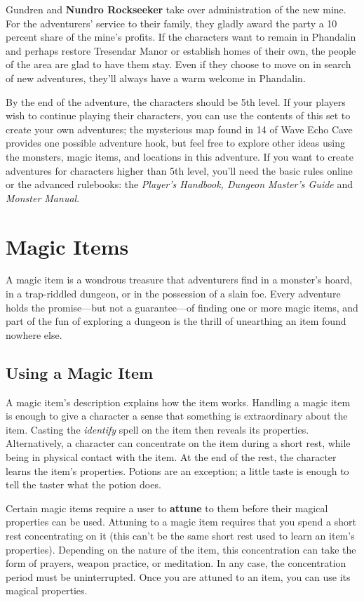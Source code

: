 \documentclass[10pt,a4paper,twoside,bg=print,twocolumn,openany,nodeprecatedcode]{dndbook}
\begin{document}
Gundren and \textbf{Nundro Rockseeker} take over administration of the new mine. For the adventurers' service to their family, they gladly award the party a 10 percent share of the mine's profits. If the characters want to remain in Phandalin and perhaps restore Tresendar Manor or establish homes of their own, the people of the area are glad to have them stay. Even if they choose to move on in search of new adventures, they'll always have a warm welcome in Phandalin.

By the end of the adventure, the characters should be 5th level. If your players wish to continue playing their characters, you can use the contents of this set to create your own adventures; the mysterious map found in 14 of Wave Echo Cave provides one possible adventure hook, but feel free to explore other ideas using the monsters, magic items, and locations in this adventure. If you want to create adventures for characters higher than 5th level, you'll need the basic rules online or the advanced rulebooks: the \textit{Player's Handbook, Dungeon Master's Guide} and \textit{Monster Manual}.

\appendix
\chapter{Magic Items}
A magic item is a wondrous treasure that adventurers find in a monster's hoard, in a trap-riddled dungeon, or in the possession of a slain foe. Every adventure holds the promise—but not a guarantee—of finding one or more magic items, and part of the fun of exploring a dungeon is the thrill of unearthing an item found nowhere else.

\section{Using a Magic Item}
A magic item's description explains how the item works. Handling a magic item is enough to give a character a sense that something is extraordinary about the item. Casting the \textit{identify} spell on the item then reveals its properties. Alternatively, a character can concentrate on the item during a short rest, while being in physical contact with the item. At the end of the rest, the character learns the item's properties. Potions are an exception; a little taste is enough to tell the taster what the potion does.

Certain magic items require a user to \textbf{attune} to them before their magical properties can be used. Attuning to a magic item requires that you spend a short rest concentrating on it (this can't be the same short rest used to learn an item's properties). Depending on the nature of the item, this concentration can take the form of prayers, weapon practice, or meditation. In any case, the concentration period must be uninterrupted. Once you are attuned to an item, you can use its magical properties.
\end{document}
